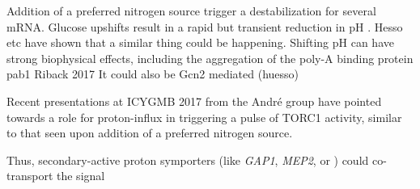 Addition of a preferred nitrogen source trigger a destabilization 
for several mRNA. 
Glucose upshifts result in a rapid but transient reduction in pH
\parencite{kresnowati2008quantitative}.
Hesso etc have shown that a similar thing could be happening.
Shifting pH can have strong biophysical effects, including
the aggregation of the poly-A binding protein pab1
Riback 2017
It could also be Gcn2 mediated (huesso)


Recent presentations at ICYGMB 2017 from the Andr\'{e} group have
pointed towards a role for proton-influx in triggering a pulse of
TORC1 activity, similar to that seen upon addition of a preferred
nitrogen source.

Thus, secondary-active proton symporters (like \textit{GAP1},
\textit{MEP2}, or ) could co-transport the signal

\parencite{kim2012need}

\fi
